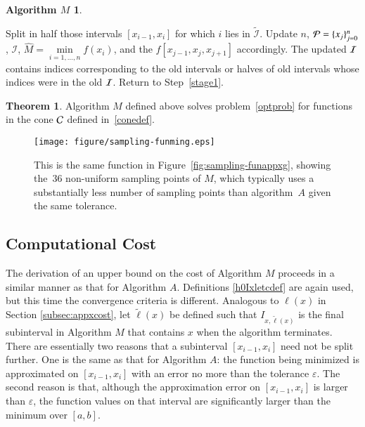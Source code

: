 \documentclass[review]{elsarticle}
\newcommand{\abstol}{\varepsilon}
\theoremstyle{definition}
\newtheorem*{algoM}{Algorithm $M$}
\newcommand{\scnote}[1]{ {\textcolor{orange}  {\mbox{**SC:} #1}}}
\newcommand{\tell}{\tilde{\ell}}
\newcommand{\hM}{\widehat{M}}
\newtheorem{theorem}{Theorem}
\newcommand{\minfi}{\min\limits_{i=1, \ldots,  n} f(x_i)} %
\begin{document}
\begin{algoM}
\begin{enumerate}[\em Step 1.]
		Split in half those intervals $[x_{i-1},x_i]$ for which $i$ lies in $\widetilde{\mathcal{I}}$.
		Update $n$, $\mathcal{P} = \{x_j\}_{j=0}^n$, $\mathcal{I}$, $\hM = \minfi$, and the $f[x_{j-1}, x_{j}, x_{j+1}]$ accordingly.  The updated $\mathcal{I}$ contains  indices corresponding to the old intervals or halves of old intervals whose indices were in the old $\mathcal{I}$.  Return to Step~\ref{stage1}.
	\end{enumerate}
\end{algoM}

\begin{theorem} \label{thm:algMworks}
Algorithm $M$ defined above solves problem~\eqref{optprob} for functions in the cone $\mathcal{C}$ defined in~\eqref{conedef}.
\end{theorem}

\begin{figure}[tbh]
\hspace{-10ex}
\texttt{[image: figure/sampling-funming.eps]}
\caption{This is the same function in Figure~\ref{fig:sampling-funappxg},
showing the~$36$ non-uniform sampling points of $M$, which typically uses a
substantially less number of sampling points than algorithm~$A$ given the same tolerance.}
\label{fig:sampling-funming}
\end{figure}

\subsection{Computational Cost} \label{subsec:optcost}
The derivation of an upper bound on the cost of Algorithm $M$ proceeds in a similar manner as that for Algorithm $A$.  Definitions \eqref{h0Ixletcdef} are again used, but this time the convergence criteria is different.  Analogous to $\ell(x)$ in Section \ref{subsec:appxcost}, let $\tell(x)$ be defined such that $I_{x,\tell(x)}$ is the final subinterval in Algorithm $M$ that contains $x$ when the algorithm terminates. There are essentially two reasons that a subinterval $[x_{i-1},x_i]$ need not be split further.  One is the same as that for Algorithm $A$:  the function being minimized is approximated on $[x_{i-1},x_i]$ with an error no more than the tolerance $\abstol$.  The second reason is that, although the approximation error on $[x_{i-1},x_i]$ is larger than $\abstol$, the function values on that interval are significantly larger than the minimum over $[a,b]$.  
\end{document}
